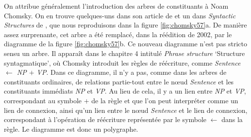 {    On attribue généralement l’introduction des arbres de constituants à Noam Chomsky. On en trouve quelques-uns dans son article de \citeyear{chomsky1955three} et un dans \textit{Syntactic Structures} de \citeyear{chomsky1957syntactic}, que nous reproduisons dans la figure \ref{fig:chomsky57}a. De manière assez surprenante, cet arbre a été remplacé, dans la réédition de 2002, par le diagramme de la figure \ref{fig:chomsky57}b. Ce nouveau diagramme n’est pas stricto sensu un arbre. Il apparaît dans le chapitre 4 intitulé \textit{Phrase structure} ‘Structure syntagmatique’, où Chomsky introduit les règles de réécriture, comme \textit{Sentence $\leftarrow$ NP $+$ VP}. Dans ce diagramme, il n’y a pas, comme dans les arbres de constituants ordinaires, de relations partie-tout entre le nœud \textit{Sentence} et les constituants immédiats \textit{NP} et \textit{VP}. Au lieu de cela, il y a un lien entre \textit{NP} et \textit{VP}, correspondant au symbole $+$ de la règle et que l’on peut interpréter comme un lien de connexion, ainsi qu’un lien entre le nœud \textit{Sentence} et le lien de connexion, correspondant à l’opération de réécriture représentée par le symbole $\leftarrow$ dans la règle. Le diagramme est donc un polygraphe.

}
